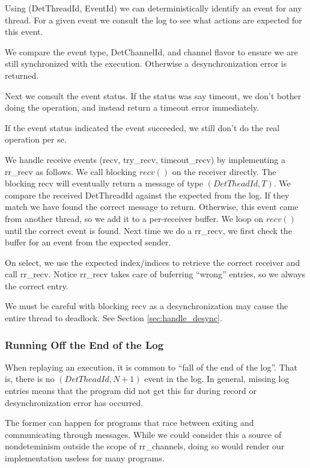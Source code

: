 \documentclass{article}
\begin{document}
Using (DetThreadId, EventId) we can deterministically identify an event for any thread.
For a given event we consult the log to see what actions are expected for this event.

We compare the event type, DetChannelId, and channel flavor to ensure we are still
synchronized with the execution. Otherwise a desynchronization error is returned.

Next we consult the event status. If the status was say timeout, we don't bother
doing the operation, and instead return a timeout error immediately.

If the event status indicated the event succeeded, we still don't do the real
operation per se.

We handle receive events (recv, try\_recv, timeout\_recv) by implementing a
rr\_recv as follows. We call blocking $recv()$ on the receiver directly.
The blocking recv will eventually return a message of type $(DetTheadId, T)$. We
compare the received DetThreadId against the expected from the log. If they match
we have found the correct message to return. Otherwise, this event came from another
thread, so we add it to a per-receiver buffer. We loop on $recv()$ until the
correct event is found. Next time we do a rr\_recv, we first check the buffer for an
event from the expected sender.

On select, we use the expected index/indices to retrieve the correct receiver and
call rr\_recv. Notice rr\_recv takes care of buferring ``wrong'' entries, so we always
the correct entry.

We must be careful with blocking recv as a desynchronization may cause the entire
thread to deadlock. See Section \ref{sec:handle_desync}.

\subsubsection{Running Off the End of the Log}
When replaying an execution, it is common to ``fall of the end of the log''. That is,
there is no $(DetTheadId, N + 1)$ event in the log. In general, missing log entries means
that the program did not get this far during record or desynchronization error has occurred.

The former can happen for programs that race between exiting and communicating through
messages. While we could consider this a source of nondeteminism outside the scope of
rr\_channels, doing so would render our implementation useless for many programs.
\end{document}
